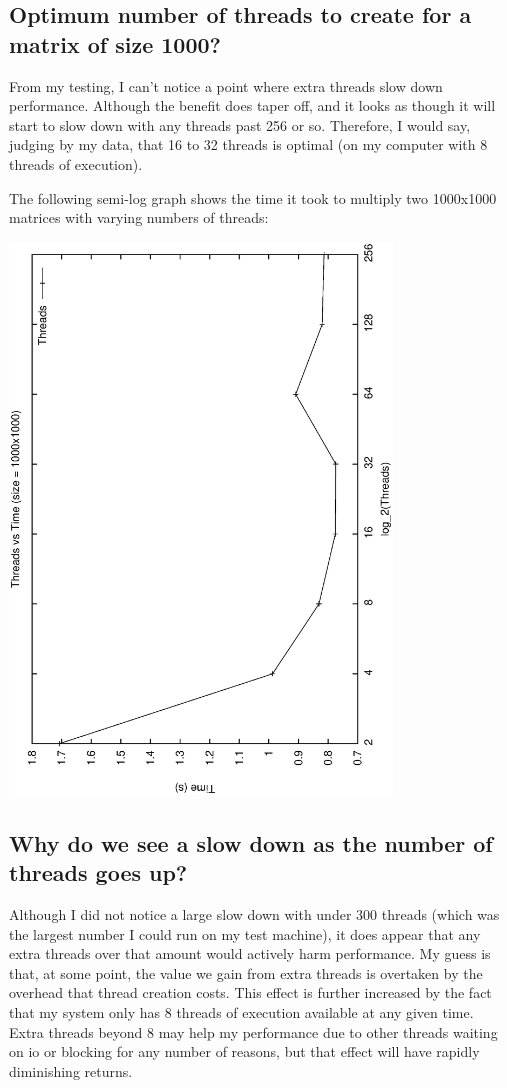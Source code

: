 \documentclass[letterpaper,10pt,titlepage]{article}
\begin{document}
\vfill\break

\subsection{Optimum number of threads to create for a matrix of size 1000?}
From my testing, I can't notice a point where extra threads slow down performance.
Although the benefit does taper off, and it looks as though it will start to slow
down with any threads past 256 or so. Therefore, I would say, judging by my data,
that 16 to 32 threads is optimal (on my computer with 8 threads of execution).

The following semi-log graph shows the time it took to multiply two 1000x1000 matrices
with varying numbers of threads:

\includegraphics[width=4in, angle=270]{thread_graph.eps}

\subsection{Why do we see a slow down as the number of threads goes up?}
Although I did not notice a large slow down with under 300 threads (which was
the largest number I could run on my test machine), it does appear that any
extra threads over that amount would actively harm performance. My guess is that,
at some point, the value we gain from extra threads is overtaken by the overhead
that thread creation costs. This effect is further increased by the fact that my
system only has 8 threads of execution available at any given time. Extra threads
beyond 8 may help my performance due to other threads waiting on io or blocking
for any number of reasons, but that effect will have rapidly diminishing returns. 
\end{document}
